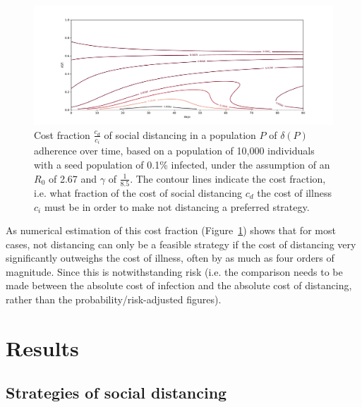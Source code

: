 \documentclass{article}
\begin{document}
\begin{figure}
	\includegraphics[width=\linewidth]{figures/cost_fraction}
	\caption{Cost fraction $\frac{c_d}{c_i}$ of social distancing in a population $P$ of $\delta(P)$ adherence over time, based on a population of 10,000 individuals with a seed population of 0.1\% infected, under the assumption of an $R_0$ of 2.67 and $\gamma$ of $\frac{1}{8.5}$. The contour lines indicate the cost fraction, i.e. what fraction of the cost of social distancing $c_d$ the cost of illness $c_i$ must be in order to make not distancing a preferred strategy.}
	\label{fig:cost_fraction}
\end{figure}

As numerical estimation of this cost fraction (Figure~\ref{fig:cost_fraction}) shows that for most cases, not distancing can only be a feasible strategy if the cost of distancing very significantly outweighs the cost of illness, often by as much as four orders of magnitude. Since this is notwithstanding risk (i.e. the comparison needs to be made between the absolute cost of infection and the absolute cost of distancing, rather than the probability/risk-adjusted figures).



\section{Results} %
\label{sec:results}

\subsection{Strategies of social distancing} %
\label{sub:strategies_of_social_distancing}
\end{document}
